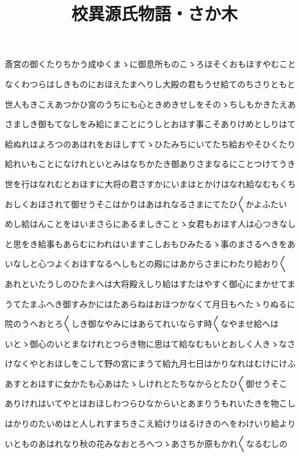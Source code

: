 \documentclass[a4paper,11pt,landscape]{ltjtarticle}
\title{校異源氏物語・さか木}
\date{}
\begin{document}
\maketitle

斎宮の御くたりちかう成ゆくまゝに御息所ものこゝろほそくおもほすやむこと
\par\medskip
なくわつらはしきものにおほえたまへりし大殿の君もうせ給てのちさりともと
\par\medskip
世人もきこえあつかひ宮のうちにも心ときめきせしをそのゝちしもかきたえあ
\par\medskip
さましき御もてなしをみ給にまことにうしとおほす事こそありけめとしりはて
\par\medskip
給ぬれはよろつのあはれをおほしすてゝひたみちにいてたち給おやそひくたり
\par\medskip
給れいもことになけれといとみはなちかたき御ありさまなるにことつけてうき
\par\medskip
世を行はなれむとおほすに大将の君さすかにいまはとかけはなれ給なむもくち
\par\medskip
おしくおほされて御せうそこはかりはあはれなるさまにてたひ〱かよふたい
\par\medskip
めし給はんことをはいまさらにあるましきことゝ女君もおほす人は心つきなし
\par\medskip
と思をき給事もあらむにわれはいますこしおもひみたるゝ事のまさるへきをあ
\par\medskip
いなしと心つよくおほすなるへしもとの殿にはあからさまにわたり給おり〱
\par\medskip
あれといたうしのひたまへは大将殿えしり給はすたはやすく御心にまかせてま
\par\medskip
うてたまふへき御すみかにはたあらねはおほつかなくて月日もへたゝりぬるに
\par\medskip
院のうへおとろ〱しき御なやみにはあらてれいならす時〱なやませ給へは
\par\medskip
いとゝ御心のいとまなけれとつらき物に思はて給なむもいとおしく人きゝなさ
\par\medskip
けなくやとおほしをこして野の宮にまうて給九月七日はかりなれはむけにけふ
\par\medskip
あすとおほすに女かたも心あはたゝしけれとたちなからとたひ〱御せうそこ
\par\medskip
ありけれはいてやとはおほしわつらひなからいとあまりうもれいたきを物こし
\par\medskip
はかりのたいめはと人しれすまちきこえ給けりはるけきのへをわけいり給より
\par\medskip
いとものあはれなり秋の花みなおとろへつゝあさちか原もかれ〱なるむしの
\end{document}
